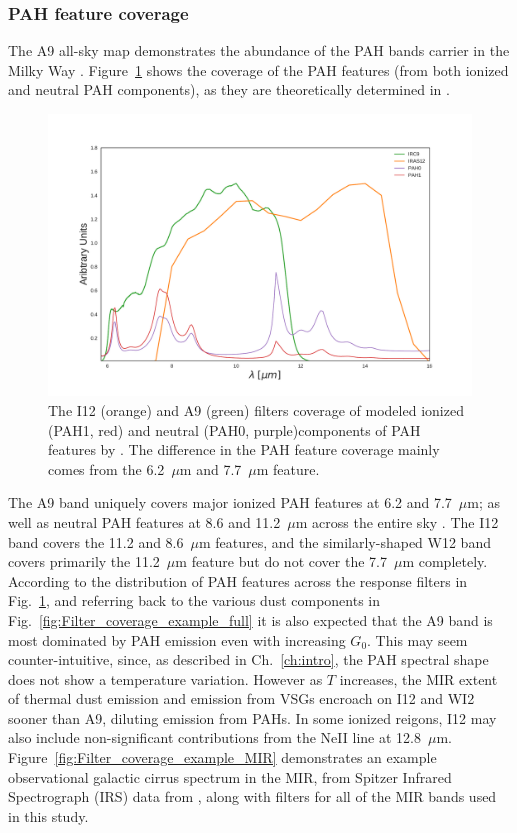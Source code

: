        \subsubsection{PAH feature coverage}
         The A9 all-sky map demonstrates the abundance of the PAH bands carrier in the Milky Way \citep{ishihara10}. Figure~\ref{fig:Filter_coverage_example_PAH} shows the coverage of the PAH features (from both ionized and neutral PAH components), as they are theoretically determined in \cite{dustem11}.
            \begin{figure}
              \centering
              \includegraphics[width=\textwidth]{../Plots/ch_datasources/Filter_coverage_example_PAH.pdf}
              \caption{The I12 (orange) and A9 (green) filters coverage of modeled ionized (PAH1, red) and neutral (PAH0, purple)components of PAH features by \cite{dustem11}. The difference in the PAH feature coverage mainly comes from the 6.2~$\mu$m and 7.7~$\mu$m feature.}
              \label{fig:Filter_coverage_example_PAH}
            \end{figure}
         The A9 band uniquely covers major ionized PAH features at 6.2 and 7.7~$\mu$m; as well as neutral PAH features at 8.6 and 11.2~$\mu$m across the entire sky \citep{irc07}. The I12 band covers the 11.2 and 8.6~$\mu$m features, and the similarly-shaped W12 band covers primarily the 11.2~$\mu{}$m feature but do not cover the 7.7~$\mu{}$m completely. According to the distribution of PAH features across the response filters in Fig.~\ref{fig:Filter_coverage_example_PAH}, and referring back to the various dust components in Fig.~\ref{fig:Filter_coverage_example_full} it is also expected that the A9 band is most dominated by PAH emission even with increasing $G_{0}$. This may seem counter-intuitive, since, as described in Ch.~\ref{ch:intro}, the PAH spectral shape does not show a temperature variation. However as $T$ increases, the MIR extent of thermal dust emission and emission from VSGs encroach on I12 and WI2 sooner than A9, diluting emission from PAHs. In some ionized reigons, I12 may also include non-significant contributions from the NeII line at 12.8~$\mu$m. Figure~\ref{fig:Filter_coverage_example_MIR} demonstrates an example observational galactic cirrus spectrum in the MIR, from Spitzer Infrared Spectrograph (IRS) \citep{spitzer04} data from \cite{}, along with filters for all of the MIR bands used in this study.
